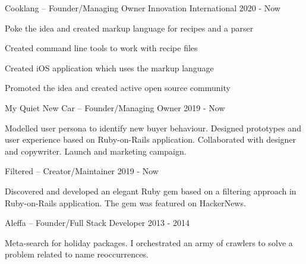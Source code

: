 


\begin{cventries}

    \cventry
    {Cooklang – Founder/Managing Owner} %
    {Innovation} %
    {International} %
    {2020 - Now} %
    {
      \begin{cvitems} %
        \item {Poke the idea and created markup language for recipes and a parser}
        \item {Created command line tools to work with recipe files}
        \item {Created iOS application which uses the markup language}
        \item {Promoted the idea and created active open source community}
      \end{cvitems}
    }

    \cventry
    {My Quiet New Car – Founder/Managing Owner} %
    {} %
    {} %
    {2019 - Now} %
    {
      \begin{cvitems} %
        \item {Modelled user persona to identify new buyer behaviour. Designed prototypes and user experience based on Ruby-on-Rails application. Collaborated with designer and copywriter. Launch and marketing campaign.}
      \end{cvitems}
    }

    \cventry
    {Filtered – Creator/Maintainer} %
    {} %
    {} %
    {2019 - Now} %
    {
      \begin{cvitems} %
        \item {Discovered and developed an elegant Ruby gem based on a filtering approach in Ruby-on-Rails application. The gem was featured on HackerNews.}
      \end{cvitems}
    }

    \cventry
    {Aleffa – Founder/Full Stack Developer} %
    {} %
    {} %
    {2013 - 2014} %
    {
      \begin{cvitems} %
        \item {Meta-search for holiday packages. I orchestrated an army of crawlers to solve a problem related to name reoccurrences.}
      \end{cvitems}
    }


\end{cventries}
